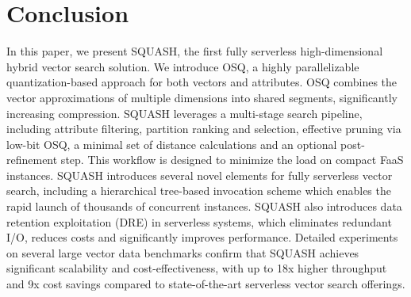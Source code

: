 \section{Conclusion}
\label{s:6-squash-conclusion}

In this paper, we present SQUASH, the first fully serverless high-dimensional hybrid vector search solution. We introduce OSQ, a highly parallelizable quantization-based approach for both vectors and attributes. 
OSQ combines the vector approximations of multiple dimensions into shared segments, significantly increasing compression.
SQUASH leverages a multi-stage search pipeline, including attribute filtering, partition ranking and selection, effective pruning via low-bit OSQ, a minimal set of distance calculations and an optional post-refinement step. 
This workflow is designed to minimize the load on compact FaaS instances. 
SQUASH introduces several novel elements for fully serverless vector search, including a hierarchical tree-based invocation scheme which enables the rapid launch of thousands of concurrent instances. 
SQUASH also introduces data retention exploitation (DRE) in serverless systems, which eliminates redundant I/O, reduces costs and significantly improves performance. Detailed experiments on several large vector data benchmarks confirm that SQUASH achieves significant scalability and cost-effectiveness, with up to 18x higher throughput and 9x cost savings compared to state-of-the-art serverless vector search offerings. 